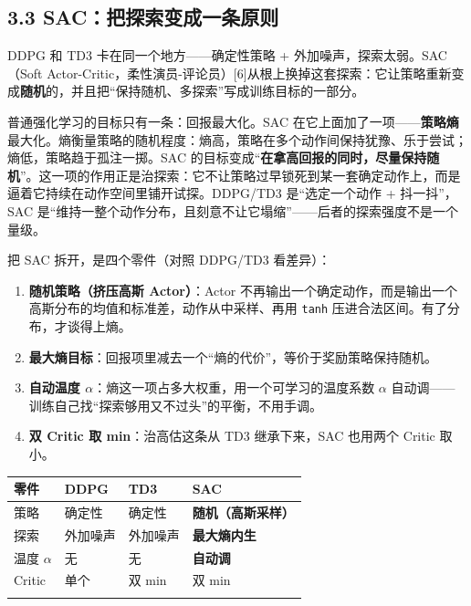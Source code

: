 \documentclass[
  chinese,
]{ctexart}
\providecommand{\tightlist}{%
  \setlength{\itemsep}{0pt}\setlength{\parskip}{0pt}}
\begin{document}
\subsection{3.3
SAC：把探索变成一条原则}\label{sacux628aux63a2ux7d22ux53d8ux6210ux4e00ux6761ux539fux5219}

DDPG 和 TD3 卡在同一个地方------确定性策略 +
外加噪声，探索太弱。SAC（Soft
Actor-Critic，柔性演员-评论员）{[}6{]}从根上换掉这套探索：它让策略重新变成\textbf{随机}的，并且把``保持随机、多探索''写成训练目标的一部分。

普通强化学习的目标只有一条：回报最大化。SAC
在它上面加了一项------\textbf{策略熵}最大化。熵衡量策略的随机程度：熵高，策略在多个动作间保持犹豫、乐于尝试；熵低，策略趋于孤注一掷。SAC
的目标变成``\textbf{在拿高回报的同时，尽量保持随机}''。这一项的作用正是治探索：它不让策略过早锁死到某一套确定动作上，而是逼着它持续在动作空间里铺开试探。DDPG/TD3
是``选定一个动作 + 抖一抖''，SAC
是``维持一整个动作分布，且刻意不让它塌缩''------后者的探索强度不是一个量级。

把 SAC 拆开，是四个零件（对照 DDPG/TD3 看差异）：

\begin{enumerate}
\def\labelenumi{\arabic{enumi}.}
\tightlist
\item
  \textbf{随机策略（挤压高斯 Actor）}：Actor
  不再输出一个确定动作，而是输出一个高斯分布的均值和标准差，动作从中采样、再用
  \texttt{tanh} 压进合法区间。有了分布，才谈得上熵。
\item
  \textbf{最大熵目标}：回报项里减去一个``熵的代价''，等价于奖励策略保持随机。
\item
  \textbf{自动温度
  \(\alpha\)}：熵这一项占多大权重，用一个可学习的温度系数 \(\alpha\)
  自动调------训练自己找``探索够用又不过头''的平衡，不用手调。
\item
  \textbf{双 Critic 取 min}：治高估这条从 TD3 继承下来，SAC 也用两个
  Critic 取小。
\end{enumerate}

\begin{center}
\begin{tabular}{@{}>{\raggedright\arraybackslash}p{} >{\raggedright\arraybackslash}p{} >{\raggedright\arraybackslash}p{} >{\raggedright\arraybackslash}p{}@{}}
\toprule\noalign{}
零件 & DDPG & TD3 & SAC \\
\midrule\noalign{}
策略 & 确定性 & 确定性 & \textbf{随机（高斯采样）} \\
探索 & 外加噪声 & 外加噪声 & \textbf{最大熵内生} \\
温度 \(\alpha\) & 无 & 无 & \textbf{自动调} \\
Critic & 单个 & 双 min & 双 min \\
\bottomrule\noalign{}
\end{tabular}
\end{center}
\end{document}
